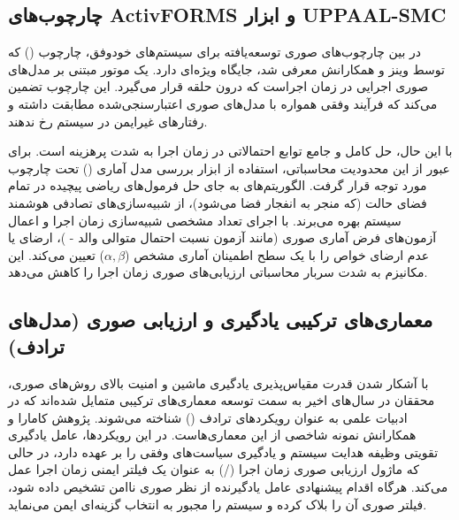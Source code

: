 \documentclass[oneside,openany,phd]{TMU-Thesis}
\begin{document}
\subsection{چارچوب‌های ActivFORMS و ابزار UPPAAL-SMC}
\label{sec:ch3_activforms_uppaal}

در بین چارچوب‌های صوری توسعه‌یافته برای سیستم‌های خودوفق، چارچوب  () که توسط وینز و همکارانش \cite{weyns2018activforms} معرفی شد، جایگاه ویژه‌ای دارد.  یک موتور مبتنی بر مدل‌های صوری اجرایی در زمان اجراست که درون حلقه  قرار می‌گیرد. این چارچوب تضمین می‌کند که فرآیند وفقی همواره با مدل‌های صوری اعتبارسنجی‌شده مطابقت داشته و رفتارهای غیرایمن در سیستم رخ ندهند.

با این حال، حل کامل و جامع توابع احتمالاتی در زمان اجرا به شدت پرهزینه است. برای عبور از این محدودیت محاسباتی، استفاده از ابزار بررسی مدل آماری () تحت چارچوب  \cite{david2015uppaal} مورد توجه قرار گرفت. الگوریتم‌های  به جای حل فرمول‌های ریاضی پیچیده در تمام فضای حالت (که منجر به انفجار فضا می‌شود)، از شبیه‌سازی‌های تصادفی هوشمند سیستم بهره می‌برند.  با اجرای تعداد مشخصی شبیه‌سازی زمان اجرا و اعمال آزمون‌های فرض آماری صوری (مانند آزمون نسبت احتمال متوالی والد - )، ارضای یا عدم ارضای خواص را با یک سطح اطمینان آماری مشخص ($\alpha, \beta$) تعیین می‌کند. این مکانیزم به شدت سربار محاسباتی ارزیابی‌های صوری زمان اجرا را کاهش می‌دهد.

\subsection{معماری‌های ترکیبی یادگیری و ارزیابی صوری (مدل‌های ترادف)}
\label{sec:ch3_hybrid_verification_learning}

با آشکار شدن قدرت مقیاس‌پذیری یادگیری ماشین و امنیت بالای روش‌های صوری، محققان در سال‌های اخیر به سمت توسعه معماری‌های ترکیبی متمایل شده‌اند که در ادبیات علمی به عنوان رویکردهای ترادف () شناخته می‌شوند. پژوهش کامارا و همکارانش \cite{camara2020quantitative} نمونه شاخصی از این معماری‌هاست. در این رویکردها، عامل یادگیری تقویتی وظیفه هدایت سیستم و یادگیری سیاست‌های وفقی را بر عهده دارد، در حالی که ماژول ارزیابی صوری زمان اجرا (/) به عنوان یک فیلتر ایمنی زمان اجرا عمل می‌کند. هرگاه اقدام پیشنهادی عامل یادگیرنده از نظر صوری ناامن تشخیص داده شود، فیلتر صوری آن را بلاک کرده و سیستم را مجبور به انتخاب گزینه‌ای ایمن می‌نماید.
\end{document}
